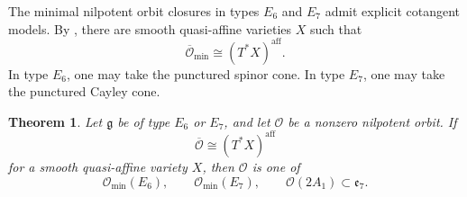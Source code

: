 \documentclass[12pt]{article}
\newtheorem{theorem}{Theorem}[section]
\theoremstyle{remark}
\theoremstyle{plain}
\newcommand{\aff}{\mathrm{aff}}
\begin{document}
The minimal nilpotent orbit closures in types $E_6$ and $E_7$ admit
explicit cotangent models.
By \cite[Theorem 1.4 and Table 2]{FuLiu}, there are smooth quasi-affine
varieties $X$ such that
\[
\overline{\mathcal O}_{\min}\cong(T^*X)^{\aff}.
\]
In type $E_6$, one may take the punctured spinor cone.
In type $E_7$, one may take the punctured Cayley cone.

\begin{theorem}\label{thm:E6E7}
Let $\mathfrak g$ be of type $E_6$ or $E_7$, and let $\mathcal O$ be a
nonzero nilpotent orbit. If
\[
\overline{\mathcal O}\cong(T^*X)^{\aff}
\]
for a smooth quasi-affine variety $X$, then $\mathcal O$ is one of
\[
\mathcal O_{\min}(E_6),\qquad
\mathcal O_{\min}(E_7),\qquad
\mathcal O(2A_1)\subset\mathfrak e_7.
\]
\end{theorem}
\end{document}

